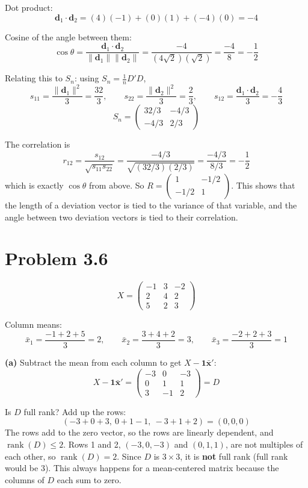 \documentclass[11pt]{article}
\begin{document}
Dot product:
\[
\mathbf d_1\cdot \mathbf d_2=(4)(-1)+(0)(1)+(-4)(0)=-4
\]

Cosine of the angle between them:
\[
\cos\theta=\frac{\mathbf d_1\cdot \mathbf d_2}{\lVert \mathbf d_1\rVert\lVert \mathbf d_2\rVert}
=\frac{-4}{(4\sqrt2)(\sqrt2)}=\frac{-4}{8}=\boxed{-\frac12}
\]

Relating this to $S_n$: using $S_n=\frac1n D'D$,
\[
s_{11}=\frac{\lVert\mathbf d_1\rVert^2}{3}=\frac{32}{3},\qquad
s_{22}=\frac{\lVert\mathbf d_2\rVert^2}{3}=\frac23,\qquad
s_{12}=\frac{\mathbf d_1\cdot \mathbf d_2}{3}=-\frac43
\]
\[
S_n=\boxed{\begin{pmatrix} 32/3 & -4/3\\ -4/3 & 2/3\end{pmatrix}}
\]

The correlation is
\[
r_{12}=\frac{s_{12}}{\sqrt{s_{11}s_{22}}}=\frac{-4/3}{\sqrt{(32/3)(2/3)}}=\frac{-4/3}{8/3}=\boxed{-\frac12}
\]
which is exactly $\cos\theta$ from above. So $R=\begin{pmatrix}1 & -1/2\\ -1/2 & 1\end{pmatrix}$.
This shows that the length of a deviation vector is tied to the variance of that variable,
and the angle between two deviation vectors is tied to their correlation.

\newpage
\section*{Problem 3.6}

\[
X=\begin{pmatrix} -1 & 3 & -2\\ 2 & 4 & 2\\ 5 & 2 & 3\end{pmatrix}
\]

Column means:
\[
\bar x_1=\frac{-1+2+5}{3}=2,\qquad \bar x_2=\frac{3+4+2}{3}=3,\qquad \bar x_3=\frac{-2+2+3}{3}=1
\]

\textbf{(a)} Subtract the mean from each column to get $X-\mathbf 1\bar{\mathbf x}'$:
\[
X-\mathbf 1\bar{\mathbf x}'=\begin{pmatrix} -3 & 0 & -3\\ 0 & 1 & 1\\ 3 & -1 & 2\end{pmatrix}=D
\]

Is $D$ full rank? Add up the rows:
\[
(-3+0+3,\ 0+1-1,\ -3+1+2)=(0,0,0)
\]
The rows add to the zero vector, so the rows are linearly dependent, and $\operatorname{rank}(D)\le 2$.
Rows 1 and 2, $(-3,0,-3)$ and $(0,1,1)$, are not multiples of each other, so
$\operatorname{rank}(D)=2$. Since $D$ is $3\times3$, it is \textbf{not} full rank (full
rank would be $3$). This always happens for a mean-centered matrix because the columns of
$D$ each sum to zero.
\end{document}
